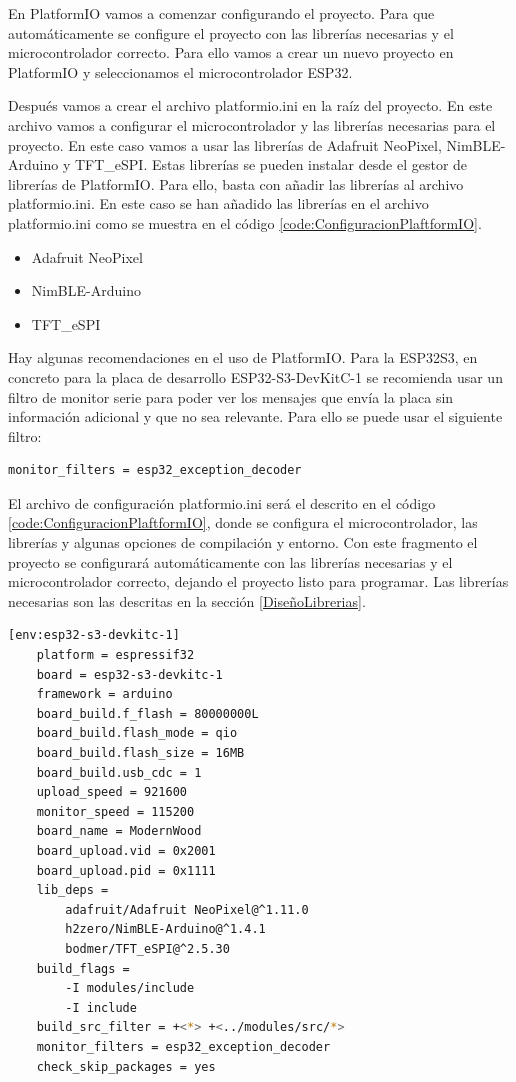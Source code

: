En \gls{PlatformIO} vamos a comenzar configurando el proyecto. Para que automáticamente se configure el proyecto con las librerías necesarias y el microcontrolador correcto. Para ello vamos a crear un nuevo proyecto en \gls{PlatformIO} y seleccionamos el microcontrolador ESP32.

Después vamos a crear el archivo platformio.ini en la raíz del proyecto. En este archivo vamos a configurar el microcontrolador y las librerías necesarias para el proyecto. En este caso vamos a usar las librerías de Adafruit NeoPixel, NimBLE-Arduino y TFT\_eSPI. Estas librerías se pueden instalar desde el gestor de librerías de \gls{PlatformIO}. Para ello, basta con añadir las librerías al archivo platformio.ini. En este caso se han añadido las librerías en el archivo platformio.ini como se muestra en el código \ref{code:ConfiguracionPlaftformIO}.

\begin{itemize}
\item Adafruit NeoPixel
\item NimBLE-Arduino
\item TFT\_eSPI
\end{itemize}
\label{LibreriasPlatformIO}

Hay algunas recomendaciones en el uso de \gls{PlatformIO}. Para la ESP32S3, en concreto para la placa de desarrollo ESP32-S3-DevKitC-1 se recomienda usar un filtro de monitor serie para poder ver los mensajes que envía la placa sin información adicional y que no sea relevante. Para ello se puede usar el siguiente filtro:

\begin{lstlisting}[style=console, language=bash, caption={Filtro recomendado de \gls{PlatformIO}}, label={code:FiltroEspecial}]
monitor_filters = esp32_exception_decoder
\end{lstlisting}
\newpage
El archivo de configuración platformio.ini será el descrito en el código \ref{code:ConfiguracionPlaftformIO}, donde se configura el microcontrolador, las librerías y algunas opciones de compilación y entorno. Con este fragmento el proyecto se configurará automáticamente con las librerías necesarias y el microcontrolador correcto, dejando el proyecto listo para programar. Las librerías necesarias son las descritas en la sección \ref{DiseñoLibrerias}.

\begin{lstlisting}[style=console, language=bash, caption={Configuracion \gls{PlatformIO}}, label={code:ConfiguracionPlaftformIO}]
    [env:esp32-s3-devkitc-1]
    platform = espressif32
    board = esp32-s3-devkitc-1
    framework = arduino
    board_build.f_flash = 80000000L
    board_build.flash_mode = qio
    board_build.flash_size = 16MB
    board_build.usb_cdc = 1
    upload_speed = 921600
    monitor_speed = 115200
    board_name = ModernWood
    board_upload.vid = 0x2001
    board_upload.pid = 0x1111
    lib_deps = 
        adafruit/Adafruit NeoPixel@^1.11.0
        h2zero/NimBLE-Arduino@^1.4.1
        bodmer/TFT_eSPI@^2.5.30
    build_flags =
        -I modules/include
        -I include
    build_src_filter = +<*> +<../modules/src/*>
    monitor_filters = esp32_exception_decoder
    check_skip_packages = yes
\end{lstlisting}


